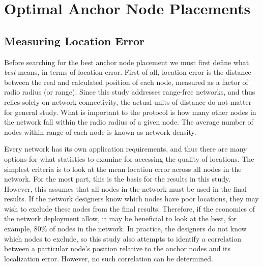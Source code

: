 \chapter{Optimal Anchor Node Placements}
\label{chap:placments}
\section{Measuring Location Error}
Before searching for the best anchor node placement we must first define what \emph{best} means, in terms of location error.  First of all, location error is the distance between the real and calculated position of each node, measured as a factor of radio radius (or range).  Since this study addresses range-free networks, and thus relies solely on network connectivity, the actual units of distance do not matter for general study.  What is important to the protocol is how many other nodes in the network fall within the radio radius of a given node.  The average number of nodes within range of each node is known as network density.

Every network has its own application requirements, and thus there are many options for what statistics to examine for accessing the quality of locations.  The simplest criteria is to look at the mean location error across all nodes in the network.  For the most part, this is the basis for the results in this study.  However, this assumes that all nodes in the network must be used in the final results.  If the network designers know which nodes have poor locations, they may wish to exclude these nodes from the final results.  Therefore, if the economics of the network deployment allow, it may be beneficial to look at the best, for example, 80\% of nodes in the network.  In practice, the designers do not know which nodes to exclude, so this study also attempts to identify a correlation between a particular node's position relative to the anchor nodes and its localization error.  However, no such correlation can be determined.

